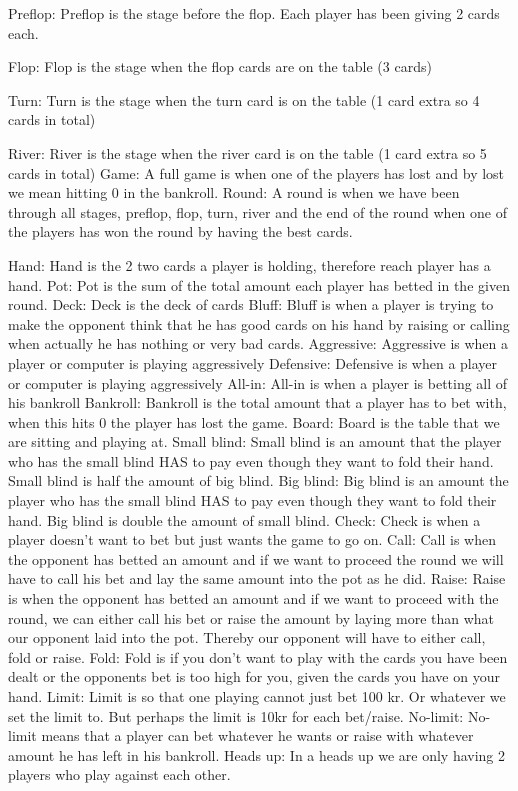 Preflop:
Preflop is the stage before the flop. Each player has been giving 2 cards each.

Flop:
Flop is the stage when the flop cards are on the table (3 cards)

Turn:
Turn is the stage when the turn card is on the table (1 card extra so 4 cards in total)

River: 
River is the stage when the river card is on the table (1 card extra so 5 cards in total)
Game:
A full game is when one of the players has lost and by lost we mean hitting 0 in the bankroll.
Round:
A round is when we have been through all stages, preflop, flop, turn, river and the end of the round when one of the players has won the round by having the best cards.

Hand:
Hand is the 2 two cards a player is holding, therefore reach player has a hand.
Pot:
Pot is the sum of the total amount each player has betted in the given round.
Deck:
Deck is the deck of cards
Bluff:
Bluff is when a player is trying to make the opponent think that he has good cards on his hand by raising or calling when actually he has nothing or very bad cards.
Aggressive:
Aggressive is when a player or computer is playing aggressively
Defensive:
Defensive is when a player or computer is playing aggressively
All-in:
All-in is when a player is betting all of his bankroll
Bankroll:
Bankroll is the total amount that a player has to bet with, when this hits 0 the player has lost the game.
Board:
Board is the table that we are sitting and playing at.
Small blind:
Small blind is an amount that the player who has the small blind HAS to pay even though they want to fold their hand. Small blind is half the amount of big blind.
Big blind:
Big blind is an amount the player who has the small blind HAS to pay even though they want to fold their hand. Big blind is double the amount of small blind.
Check:
Check is when a player doesn’t want to bet but just wants the game to go on.
Call:
Call is when the opponent has betted an amount and if we want to proceed the round we will have to call his bet and lay the same amount into the pot as he did.
Raise:
Raise is when the opponent has betted an amount and if we want to proceed with the round, we can either call his bet or raise the amount by laying more than what our opponent laid into the pot. Thereby our opponent will have to either call, fold or raise.
Fold:
Fold is if you don’t want to play with the cards you have been dealt or the opponents bet is too high for you, given the cards you have on your hand.
Limit:
Limit is so that one playing cannot just bet 100 kr. Or whatever we set the limit to. But perhaps the limit is 10kr for each bet/raise.
No-limit:
No-limit means that a player can bet whatever he wants or raise with whatever amount he has left in his bankroll.
Heads up:
In a heads up we are only having 2 players who play against each other.
